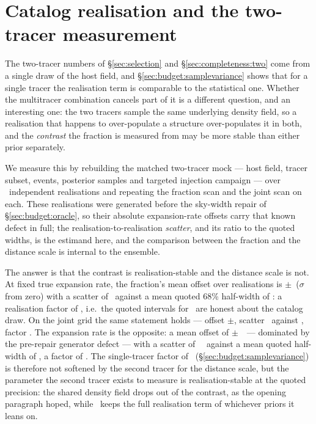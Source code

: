 \section{Catalog realisation and the two-tracer measurement}
\label{sec:scatter}

The two-tracer numbers of \S\ref{sec:selection} and \S\ref{sec:completeness:two}
come from a single draw of the host field, and \S\ref{sec:budget:samplevariance}
shows that for a single tracer the realisation term is comparable to the
statistical one. Whether the multitracer combination cancels part of it is a
different question, and an interesting one: the two tracers sample the same
underlying density field, so a realisation that happens to over-populate a
structure over-populates it in both, and the \emph{contrast} the fraction is
measured from may be more stable than either prior separately.

We measure this by rebuilding the matched two-tracer mock --- host field, tracer
subset, events, posterior samples and targeted injection campaign --- over
\SdsN\ independent realisations and repeating the fraction scan and the joint
scan on each. These realisations were generated before the sky-width repair of
\S\ref{sec:budget:oracle}, so their absolute expansion-rate offsets carry that
known defect in full; the realisation-to-realisation \emph{scatter}, and its
ratio to the quoted widths, is the estimand here, and the comparison between
the fraction and the distance scale is internal to the ensemble.

The answer is that the contrast is realisation-stable and the distance scale
is not. At fixed true expansion rate, the fraction's mean offset over
realisations is \SdsFscanOffset$\pm$\SdsFscanSem\ (\SdsFscanSig$\sigma$ from
zero) with a scatter of \SdsFscanScatter\ against a mean quoted 68\%
half-width of \SdsFscanHw: a realisation factor of \SdsFscanFactor, i.e.\ the
quoted intervals for \fagn\ are honest about the catalog draw. On the joint
grid the same statement holds --- offset \SdsFOffset$\pm$\SdsFSem, scatter
\SdsFScatter\ against \SdsFHw, factor \SdsFFactor. The expansion rate is the
opposite: a mean offset of \SdsHzeroOffset$\pm$\SdsHzeroSem~\kmsmpc\ ---
dominated by the pre-repair generator defect --- with a scatter of
\SdsHzeroScatter~\kmsmpc\ against a mean quoted half-width of \SdsHzeroHw, a
factor of \SdsHzeroFactor. The single-tracer factor of \CloSeedUnderFactor\
(\S\ref{sec:budget:samplevariance}) is therefore not softened by the second
tracer for the distance scale, but the parameter the second tracer exists to
measure is realisation-stable at the quoted precision: the shared density
field drops out of the contrast, as the opening paragraph hoped, while \Hz\
keeps the full realisation term of whichever priors it leans on.

